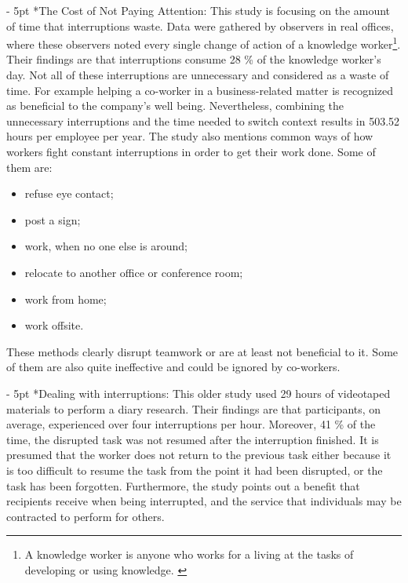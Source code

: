 \documentclass[11pt,singleside]{myfithesis2}
\makeatletter
\renewcommand\paragraph{
   \vspace{-10pt}
   \@startsection{paragraph}{4}{0mm}
      {\baselineskip}
      {- 5pt}
      {\normalfont\normalsize\bfseries}
}
\makeatother
\begin{document}
\paragraph*{The Cost of Not Paying Attention: } This study \cite{studyAttention} is focusing on the amount of time that interruptions waste. Data were gathered by observers in real offices, where these observers noted every single change of action of a knowledge worker\footnote{A knowledge worker is anyone who works for a living at the tasks of developing or using knowledge. \cite{knowledgeWorker}}. Their findings are that interruptions consume 28 \% of the knowledge worker's day. Not all of these interruptions are unnecessary and considered as a waste of time. For example helping a co-worker in a business-related matter is recognized as beneficial to the company's well being. Nevertheless, combining the unnecessary interruptions and the time needed to switch context results in 503.52 hours per employee per year. The study also mentions common ways of how workers fight constant interruptions in order to get their work done. Some of them are: \label{list:avoidingCommunication}
\begin{itemize}
	\item refuse eye contact;
	\item post a sign;
	\item work, when no one else is around;
	\item relocate to another office or conference room;
	\item work from home;
	\item work offsite.
\end{itemize}
These methods clearly disrupt teamwork or are at least not beneficial to it. Some of them are also quite ineffective and could be ignored by co-workers.
\paragraph*{Dealing with interruptions: } This older study \cite{studyDealingWithInterruptions} used 29 hours of videotaped materials to perform a diary research. Their findings are that participants, on average, experienced over four interruptions per hour. Moreover, 41 \% of the time, the disrupted task was not resumed after the interruption finished. It is presumed that the worker does not return to the previous task either because it is too difficult to resume the task from the point it had been disrupted, or the task has been forgotten. Furthermore, the study points out a benefit that recipients receive when being interrupted, and the service that individuals may be contracted to perform for others.
\end{document}
